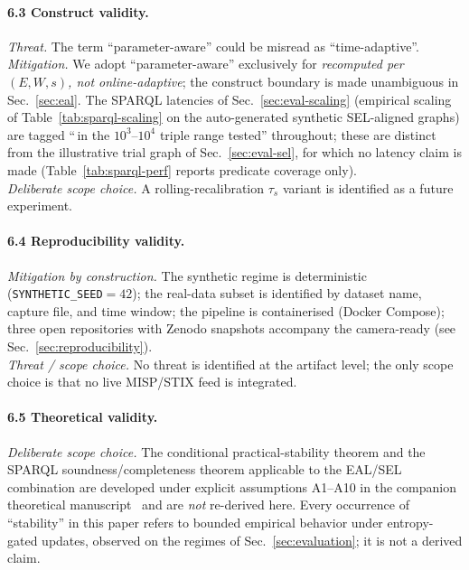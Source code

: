 \documentclass[futureinternet,article,submit,pdftex,moreauthors]{Definitions/mdpi}
\newcommand{\taus}{\ensuremath{\tau_{s}}}
\begin{document}
\paragraph{6.3 Construct validity.}
\emph{Threat.} The term ``parameter-aware'' could be misread as
``time-adaptive''.\\
\emph{Mitigation.} We adopt ``parameter-aware'' exclusively for
\emph{recomputed per $(E, W, s)$, not online-adaptive}; the construct
boundary is made unambiguous in Sec.~\ref{sec:eal}. The SPARQL latencies
of Sec.~\ref{sec:eval-scaling} (empirical scaling of
Table~\ref{tab:sparql-scaling} on the auto-generated synthetic
SEL-aligned graphs) are tagged ``\,in the
$10^{3}$--$10^{4}$ triple range tested'' throughout; these are distinct
from the illustrative trial graph of Sec.~\ref{sec:eval-sel}, for which
no latency claim is made (Table~\ref{tab:sparql-perf} reports predicate
coverage only).\\
\emph{Deliberate scope choice.} A rolling-recalibration $\taus$ variant
is identified as a future experiment.

\paragraph{6.4 Reproducibility validity.}
\emph{Mitigation by construction.} The synthetic regime is deterministic
(\texttt{SYNTHETIC\_SEED}$=42$); the real-data subset is identified by
dataset name, capture file, and time window; the pipeline is
containerised (Docker Compose); three open repositories with Zenodo
snapshots accompany the camera-ready (see
Sec.~\ref{sec:reproducibility}).\\
\emph{Threat / scope choice.} No threat is identified at the artifact
level; the only scope choice is that no live MISP/STIX feed is
integrated.

\paragraph{6.5 Theoretical validity.}
\emph{Deliberate scope choice.} The conditional practical-stability
theorem and the SPARQL soundness/completeness theorem applicable to the
EAL/SEL combination are developed under explicit assumptions A1--A10 in
the companion theoretical manuscript~\cite{paper5} and are \emph{not}
re-derived here. Every occurrence of ``stability'' in this paper refers
to bounded empirical behavior under entropy-gated updates, observed on
the regimes of Sec.~\ref{sec:evaluation}; it is not a derived claim.
\end{document}
